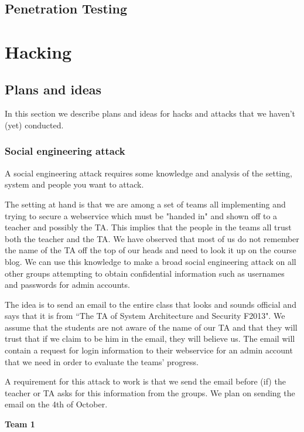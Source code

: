 \documentclass[a4paper]{article}
\begin{document}
\subsection{Penetration Testing}

\section{Hacking}
\subsection{Plans and ideas}
In this section we describe plans and ideas for hacks and attacks that we haven't (yet) conducted.
\subsubsection{Social engineering attack}
A social engineering attack requires some knowledge and analysis of the setting, system and people you want to attack.

The setting at hand is that we are among a set of teams all implementing and trying to secure a webservice which must be "handed in" and shown off to a teacher and possibly the TA. This implies that the people in the teams all trust both the teacher and the TA. We have observed that most of us do not remember the name of the TA off the top of our heads and need to look it up on the course blog.
We can use this knowledge to make a broad social engineering attack on all other groups attempting to obtain confidential information such as usernames and passwords for admin accounts.

The idea is to send an email to the entire class that looks and sounds official and says that it is from ``The TA of System Architecture and Security F2013". We assume that the students are not aware of the name of our TA and that they will trust that if we claim to be him in the email, they will believe us. The email will contain a request for login information to their webservice for an admin account that we need in order to evaluate the teams' progress.

A requirement for this attack to work is that we send the email before (if) the teacher or TA asks for this information from the groups. We plan on sending the email on the 4th of October.


\textbf{Team 1}

\end{document}
